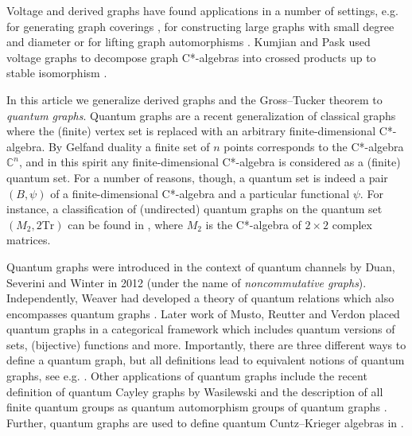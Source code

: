 \documentclass{amsart}
\newcommand{\C}{\mathbb{C}}
\theoremstyle{definition}
\theoremstyle{definition}
\begin{document}
%
Voltage and derived graphs have found applications in a number of settings, e.g. for generating graph coverings \cite{gross_coverings_1977}, for constructing large graphs with small degree and diameter \cite{brankovic_large_1998} or for lifting graph automorphisms \cite{malnic_lifting_2000}. Kumjian and Pask used voltage graphs to decompose graph C*-algebras into crossed products up to stable isomorphism \cite{kumjian_c-algebras_1999}. 

In this article we generalize derived graphs and the Gross--Tucker theorem to \emph{quantum graphs}. Quantum graphs are a recent generalization of classical graphs where the (finite) vertex set is replaced with an arbitrary finite-dimensional C*-algebra. By Gelfand duality a finite set of $n$ points corresponds to the C*-algebra $\C^n$, and in this spirit any finite-dimensional C*-algebra is considered as a (finite) quantum set. For a number of reasons, though, a quantum set is indeed a pair $(B, \psi)$ of a finite-dimensional C*-algebra and a particular functional $\psi$.
For instance, a classification of (undirected) quantum graphs on the quantum set $(M_2, 2 \mathrm{Tr})$ can be found in \cite{gromada_examples_2022, matsuda_classification_2022}, where $M_2$ is the C*-algebra of $2 \times 2$ complex matrices.

Quantum graphs were introduced in the context of quantum channels by Duan, Severini and Winter in 2012 \cite{duan_zero-error_2013} (under the name of \emph{noncommutative graphs}). Independently, Weaver had developed a theory of quantum relations which also encompasses quantum graphs \cite{weaver_quantum_2012,weaver_quantum_graphs_2015}. Later work of Musto, Reutter and Verdon \cite{musto_compositional_2018} placed quantum graphs in a categorical framework which includes quantum versions of sets, (bijective) functions and more. Importantly, there are three different ways to define a quantum graph, but all definitions lead to equivalent notions of quantum graphs, see e.g. \cite{musto_compositional_2018, daws_quantum_2024, wasilewski_quantum_2024}. Other applications of quantum graphs include the recent definition of quantum Cayley graphs by Wasilewski \cite{wasilewski_quantum_2024} and the description of all finite quantum groups as quantum automorphism groups of quantum graphs \cite{brannan_quantum_2025}. Further, quantum graphs are used to define quantum Cuntz--Krieger algebras in \cite{brannan_quantum_CuntzKrieger_2022, brannan_quantum_edge_2022}.
\end{document}
